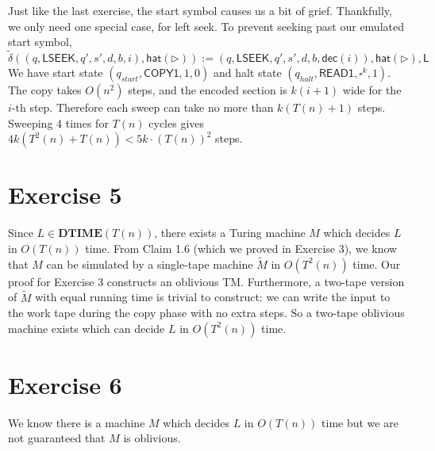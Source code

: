 \documentclass[12pt]{article}
\begin{document}
Just like the last exercise, the start symbol causes us a bit of grief. Thankfully, we only need one special case, for left seek. To prevent seeking past our emulated start symbol,
$$
\tilde{\delta}((q, \textsf{LSEEK}, q', s', d, b, i), \textsf{hat}(\triangleright)) := (q, \textsf{LSEEK}, q', s', d, b, \textsf{dec}(i)), \textsf{hat}(\triangleright), \textsf{L}
$$
We have start state $(q_{start}, \textsf{COPY1}, 1, 0)$ and halt state $(q_{halt}, \textsf{READ1}, \square^k, 1)$. The copy takes $O(n^2)$ steps, and the encoded section is $k(i+1)$ wide for the $i$-th step. Therefore each sweep can take no more than $k(T(n) + 1)$ steps. Sweeping 4 times for $T(n)$ cycles gives $4k(T^2(n) + T(n)) < 5k \cdot (T(n))^2$ steps.

\section*{Exercise 5}


Since $L \in \textbf{DTIME}(T(n))$, there exists a Turing machine $M$ which decides $L$ in $O(T(n))$ time. From Claim 1.6 (which we proved in Exercise 3), we know that $M$ can be simulated by a single-tape machine $\tilde{M}$ in $O(T^2(n))$ time. Our proof for Exercise 3 constructs an oblivious TM. Furthermore, a two-tape version of $\tilde{M}$ with equal running time is trivial to construct: we can write the input to the work tape during the copy phase with no extra steps. So a two-tape oblivious machine exists which can decide $L$ in $O(T^2(n))$ time.

\section*{Exercise 6}


We know there is a machine $M$ which decides $L$ in $O(T(n))$ time but we are not guaranteed that $M$ is oblivious.
\end{document}

